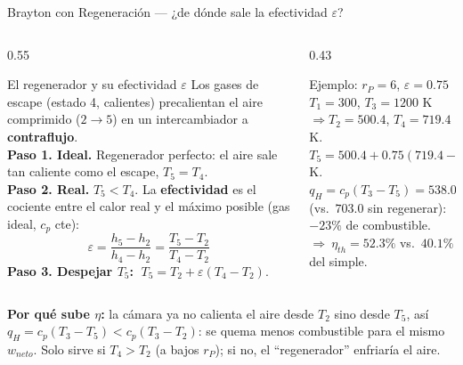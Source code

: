 \documentclass[aspectratio=169,10pt]{beamer}
\begin{document}
\begin{frame}{Brayton con Regeneración --- ¿de dónde sale la efectividad $\varepsilon$?}
\begin{columns}[T]
\begin{column}{0.55\textwidth}
\begin{cardidea}{El regenerador y su efectividad $\varepsilon$}{\faRandom}
{\footnotesize
Los gases de escape (estado 4, calientes) precalientan el aire comprimido ($2\to5$) en un intercambiador a \textbf{contraflujo}.\\[1.2mm]
\textbf{Paso 1. Ideal.} Regenerador perfecto: el aire sale tan caliente como el escape, $T_5=T_4$.\\[1.2mm]
\textbf{Paso 2. Real.} $T_5<T_4$. La \textbf{efectividad} es el cociente entre el calor real y el máximo posible (gas ideal, $c_p$ cte):
$$\boxed{\;\varepsilon=\dfrac{h_5-h_2}{h_4-h_2}=\dfrac{T_5-T_2}{T_4-T_2}\;}$$
\textbf{Paso 3. Despejar $T_5$:} $\;T_5=T_2+\varepsilon(T_4-T_2)$.
}
\end{cardidea}
\end{column}
\begin{column}{0.43\textwidth}
\begin{cardgear}{Ejemplo: $r_P=6$, $\varepsilon=0.75$}{\faCalculator}
{\footnotesize
$T_1=300$, $T_3=1200$ K $\Rightarrow T_2=500.4$, $T_4=719.4$ K.\\[1mm]
$T_5=500.4+0.75(719.4-500.4)=664.7$ K.\\[1.2mm]
$q_H=c_p(T_3-T_5)=538.0$ (vs.\ $703.0$ sin regenerar): $-23\%$ de combustible.\\[1mm]
$\Rightarrow\ \eta_{th}=52.3\%$ vs.\ $40.1\%$ del simple.
}
\end{cardgear}
\end{column}
\end{columns}
\vspace{1mm}
\begin{cardnota}[\faFire]
{\footnotesize\textbf{Por qué sube $\eta$:} la cámara ya no calienta el aire desde $T_2$ sino desde $T_5$, así $q_H=c_p(T_3-T_5)<c_p(T_3-T_2)$: se quema menos combustible para el mismo $w_{neto}$. Solo sirve si $T_4>T_2$ (a bajos $r_P$); si no, el ``regenerador'' enfriaría el aire.}
\end{cardnota}
\end{frame}
\end{document}
